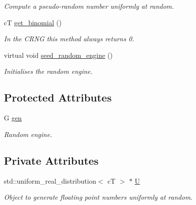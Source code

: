 \begin{DoxyCompactItemize}
\begin{DoxyCompactList}\small\item\em Compute a pseudo-\/random number uniformly at random. \end{DoxyCompactList}\item 
\mbox{\label{classlgraph_1_1utils_1_1crandom__generator_ac1f724180b858b6a1f67451060de6896}} 
cT \hyperlink{classlgraph_1_1utils_1_1crandom__generator_ac1f724180b858b6a1f67451060de6896}{get\+\_\+binomial} ()
\begin{DoxyCompactList}\small\item\em In the C\+R\+NG this method always returns 0. \end{DoxyCompactList}\item 
\mbox{\label{classlgraph_1_1utils_1_1random__generator_a4eb6998070eecb59bd89dca92d8a509c}} 
virtual void \hyperlink{classlgraph_1_1utils_1_1random__generator_a4eb6998070eecb59bd89dca92d8a509c}{seed\+\_\+random\+\_\+engine} ()
\begin{DoxyCompactList}\small\item\em Initialises the random engine. \end{DoxyCompactList}\end{DoxyCompactItemize}
\subsection*{Protected Attributes}
\begin{DoxyCompactItemize}
\item 
\mbox{\label{classlgraph_1_1utils_1_1random__generator_a18353876b4c2d3a18aee454b5750a0a0}} 
G \hyperlink{classlgraph_1_1utils_1_1random__generator_a18353876b4c2d3a18aee454b5750a0a0}{gen}
\begin{DoxyCompactList}\small\item\em Random engine. \end{DoxyCompactList}\end{DoxyCompactItemize}
\subsection*{Private Attributes}
\begin{DoxyCompactItemize}
\item 
\mbox{\label{classlgraph_1_1utils_1_1crandom__generator_adf5cffef2c6372c6fcafa7b461428cb1}} 
std\+::uniform\+\_\+real\+\_\+distribution$<$ cT $>$ $\ast$ \hyperlink{classlgraph_1_1utils_1_1crandom__generator_adf5cffef2c6372c6fcafa7b461428cb1}{U}
\begin{DoxyCompactList}\small\item\em Object to generate floating point numbers uniformly at random. \end{DoxyCompactList}\end{DoxyCompactItemize}


